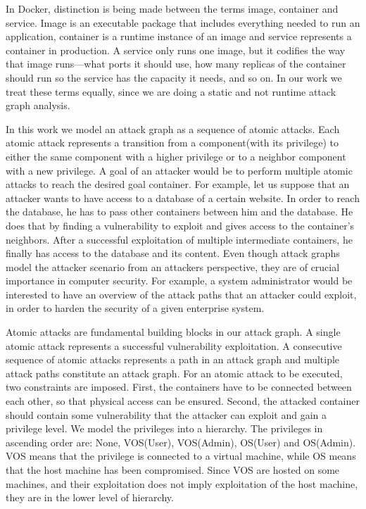 \documentclass[letterpaper, 10 pt, conference]{ieeeconf}  %
\begin{document}
In Docker, distinction is being made between the terms image, container and service. Image is an executable package that includes everything needed to run an application, container is a runtime instance of an image and service represents a container in production. A service only runs one image, but it codifies the way that image runs—what ports it should use, how many replicas of the container should run so the service has the capacity it needs, and so on. In our work we treat these terms equally, since we are doing a static and not runtime attack graph analysis.\cite{docker}

In this work we model an attack graph as a sequence of atomic attacks. Each atomic attack represents a transition from a component(with its privilege) to either the same component with a higher privilege or to a neighbor component with a new privilege. A goal of an attacker would be to perform multiple atomic attacks to reach the desired goal container. For example, let us suppose that an attacker wants to have access to a database of a certain website. In order to reach the database, he has to pass other containers between him and the database. He does that by finding a vulnerability to exploit and gives access to the container's neighbors. After a successful exploitation of multiple intermediate containers, he finally has access to the database and its content. Even though attack graphs model the attacker scenario from an attackers perspective, they are of crucial importance in computer security. For example, a system administrator would be interested to have an overview of the attack paths that an attacker could exploit, in order to harden the security of a given enterprise system.

Atomic attacks are fundamental building blocks in our attack graph. A single atomic attack represents a successful vulnerability exploitation. A consecutive sequence of atomic attacks represents a path in an attack graph and multiple attack paths constitute an attack graph. For an atomic attack to be executed, two constraints are imposed. First, the containers have to be connected between each other, so that physical access can be ensured. Second, the attacked container should contain some vulnerability that the attacker can exploit and gain a privilege level. We model the privileges into a hierarchy. The privileges in ascending order are: None, VOS(User), VOS(Admin), OS(User) and OS(Admin). VOS means that the privilege is connected to a virtual machine, while OS means that the host machine has been compromised. Since VOS are hosted on some machines, and their exploitation does not imply exploitation of the host machine, they are in the lower level of hierarchy.\cite{aksu}
\end{document}
